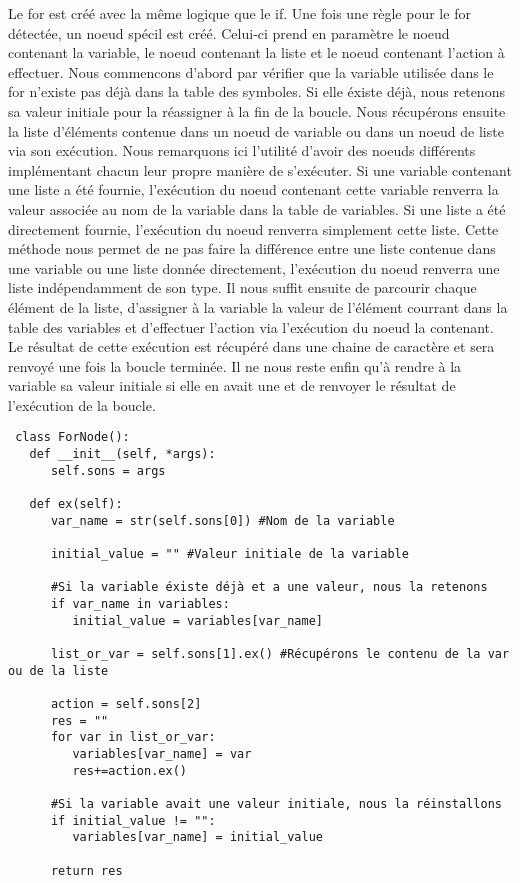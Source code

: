 \documentclass[a4paper,10pt]{article}
\begin{document}
Le \textrm{for} est créé avec la même logique que le \textrm{if}. Une fois une règle pour le \textrm{for} détectée, un noeud spécil est créé. Celui-ci prend en paramètre le noeud contenant
la variable, le noeud contenant la liste et le noeud contenant l'action à effectuer. Nous commencons d'abord par vérifier que la variable utilisée dans le for n'existe pas déjà dans la 
table des symboles. Si elle éxiste déjà, nous retenons sa valeur initiale pour la réassigner à la fin de la boucle. Nous récupérons ensuite la liste d'éléments contenue dans un noeud de variable
ou dans un noeud de liste via son exécution. Nous remarquons ici l'utilité d'avoir des noeuds différents implémentant chacun leur propre manière de s'exécuter. Si une variable contenant
une liste a été fournie, l'exécution du noeud contenant cette variable renverra la valeur associée au nom de la variable dans la table de variables. Si une liste a été directement fournie,
l'exécution du noeud renverra simplement cette liste. Cette méthode nous permet de ne pas faire la différence entre une liste contenue dans une variable ou une liste donnée directement, l'exécution
du noeud renverra une liste indépendamment de son type. Il nous suffit ensuite de parcourir chaque élément de la liste, d'assigner à la variable la valeur de l'élément courrant dans la table
des variables et d'effectuer l'action via l'exécution du noeud la contenant. Le résultat de cette exécution est récupéré dans une chaine de caractère et sera renvoyé une fois la boucle 
terminée. Il ne nous reste enfin qu'à rendre à la variable sa valeur initiale si elle en avait une et de renvoyer le résultat de l'exécution de la boucle.
\begin{verbatim}
 class ForNode():
   def __init__(self, *args):
      self.sons = args
         
   def ex(self):
      var_name = str(self.sons[0]) #Nom de la variable

      initial_value = "" #Valeur initiale de la variable

      #Si la variable éxiste déjà et a une valeur, nous la retenons
      if var_name in variables:
         initial_value = variables[var_name]

      list_or_var = self.sons[1].ex() #Récupérons le contenu de la var ou de la liste
      
      action = self.sons[2]
      res = ""
      for var in list_or_var:
         variables[var_name] = var
         res+=action.ex()

      #Si la variable avait une valeur initiale, nous la réinstallons
      if initial_value != "":
         variables[var_name] = initial_value

      return res
\end{verbatim}
\end{document}
